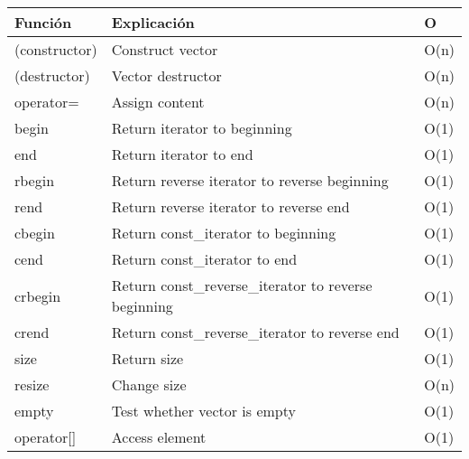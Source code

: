 \begin{center}
    \begin{tabular}{||l|l|l||}
        \hline
        \textbf{Función}          & \textbf{Explicación}                              & \textbf{O} \\ \hline
        (constructor)             & Construct vector                                  & O(n)                 \\ \hline
        (destructor)              & Vector destructor                                 & O(n)                 \\ \hline
        operator=                 & Assign content                                    & O(n)                 \\ \hline
        begin                     & Return iterator to beginning                      & O(1)                 \\ \hline
        end                       & Return iterator to end                            & O(1)                 \\ \hline
        rbegin                    & Return reverse iterator to reverse beginning      & O(1)                 \\ \hline
        rend                      & Return reverse iterator to reverse end            & O(1)                 \\ \hline
        cbegin                    & Return const\_iterator to beginning               & O(1)                 \\ \hline
        cend                      & Return const\_iterator to end                     & O(1)                 \\ \hline
        crbegin                   & Return const\_reverse\_iterator to reverse beginning  & O(1)             \\ \hline
        crend                     & Return const\_reverse\_iterator to reverse end    & O(1)                 \\ \hline
        size                      & Return size                                       & O(1)                 \\ \hline
        resize                    & Change size                                       & O(n)                 \\ \hline
        empty                     & Test whether vector is empty                      & O(1)                 \\ \hline
        operator[]                & Access element                                    & O(1)                 \\ \hline

\end{tabular}
\end{center}
